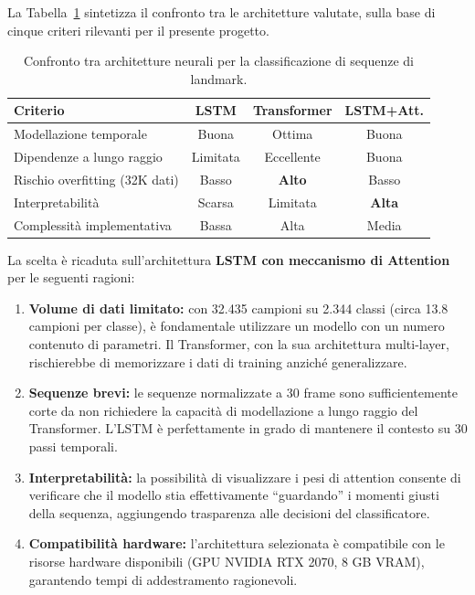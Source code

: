 La Tabella~\ref{tab:confronto_architetture} sintetizza il confronto tra le architetture valutate, sulla base di cinque criteri rilevanti per il presente progetto.

\begin{table}[H]
\centering
\begin{tabular}{lccc}
\hline
\textbf{Criterio} & \textbf{LSTM} & \textbf{Transformer} & \textbf{LSTM+Att.} \\
\hline
Modellazione temporale         & Buona    & Ottima     & Buona     \\
Dipendenze a lungo raggio      & Limitata & Eccellente & Buona     \\
Rischio overfitting (32K dati) & Basso    & \textbf{Alto} & Basso     \\
Interpretabilità               & Scarsa   & Limitata   & \textbf{Alta} \\
Complessità implementativa     & Bassa    & Alta       & Media     \\
\hline
\end{tabular}
\caption{Confronto tra architetture neurali per la classificazione di sequenze di landmark.}
\label{tab:confronto_architetture}
\end{table}

La scelta è ricaduta sull'architettura \textbf{LSTM con meccanismo di Attention} per le seguenti ragioni:

\begin{enumerate}
    \item \textbf{Volume di dati limitato:} con 32.435 campioni su 2.344 classi (circa 13.8 campioni per classe), è fondamentale utilizzare un modello con un numero contenuto di parametri. Il Transformer, con la sua architettura multi-layer, rischierebbe di memorizzare i dati di training anziché generalizzare.

    \item \textbf{Sequenze brevi:} le sequenze normalizzate a 30 frame sono sufficientemente corte da non richiedere la capacità di modellazione a lungo raggio del Transformer. L'LSTM è perfettamente in grado di mantenere il contesto su 30 passi temporali.

    \item \textbf{Interpretabilità:} la possibilità di visualizzare i pesi di attention consente di verificare che il modello stia effettivamente ``guardando'' i momenti giusti della sequenza, aggiungendo trasparenza alle decisioni del classificatore.

    \item \textbf{Compatibilità hardware:} l'architettura selezionata è compatibile con le risorse hardware disponibili (GPU NVIDIA RTX 2070, 8 GB VRAM), garantendo tempi di addestramento ragionevoli.
\end{enumerate}
